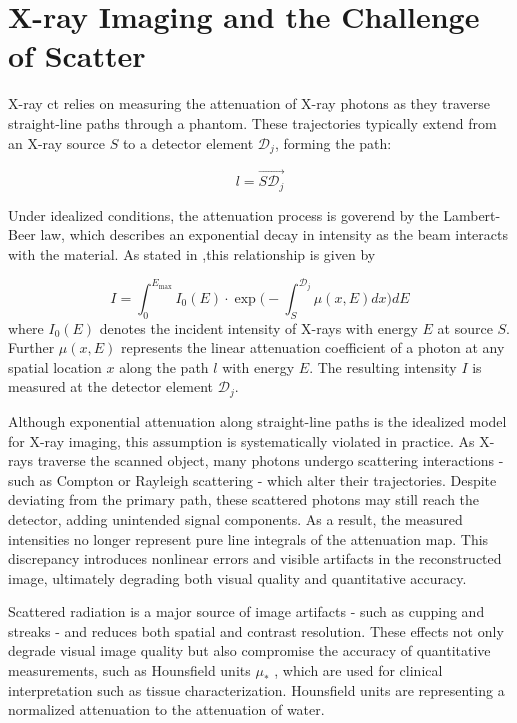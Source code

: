 \section{X-ray Imaging and the Challenge of Scatter}

X-ray \ac{ct} relies on measuring the attenuation of X-ray photons as they
traverse straight-line paths through a phantom. These trajectories typically
extend from an X-ray source $S$ to a detector element $\mathcal{D}_j$, forming
the path:

$$l=\overrightarrow{S\mathcal{D}_j}$$

Under idealized conditions, the attenuation process is goverend by the
Lambert-Beer law, which describes an exponential decay in intensity as the beam
interacts with the material. As stated in \cite[Chap.
7]{medicalImagingSystemsIntro2019:} ,this relationship is given by

\begin{equation}
    \label{eq:lambert_beer_law}
     I = \int_0^{E_\text{max}}{I_0(E)\cdot \exp\bigg(-\int_{S}^{\mathcal{D}_j}{\mu(x,E)dx}\bigg)} dE
\end{equation}
where $I_0(E)$ denotes the incident intensity of X-rays with energy $E$ at
source $S$. Further $\mu(x,E)$ represents the linear attenuation coefficient of
a photon at any spatial location $x$ along the path $l$ with energy $E$. The
resulting intensity $I$ is measured at the detector element $\mathcal{D}_j$.

Although exponential attenuation along straight-line paths is the idealized
model for X-ray imaging, this assumption is systematically violated in practice.
As X-rays traverse the scanned object, many photons undergo scattering
interactions - such as Compton or Rayleigh scattering - which alter their
trajectories. Despite deviating from the primary path, these scattered photons
may still reach the detector, adding unintended signal components. As a result,
the measured intensities no longer represent pure line integrals of the
attenuation map. This discrepancy introduces nonlinear errors and visible
artifacts in the reconstructed image, ultimately degrading both visual quality
and quantitative accuracy.

Scattered radiation is a major source of image artifacts - such as cupping and
streaks - and reduces both spatial and contrast resolution. These effects not
only degrade visual image quality but also compromise the accuracy of
quantitative measurements, such as Hounsfield units $\mu_*$ \cite[Chap.
8]{medicalImagingSystemsIntro2019:}, which are used for clinical interpretation
such as tissue characterization. Hounsfield units are representing a
normalized attenuation to the attenuation of water.

